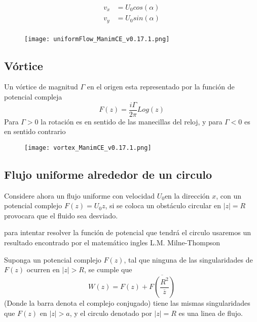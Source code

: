 \documentclass[12pt]{article}
\begin{document}
			\begin{equation}
				\begin{split}
				v_x &= U_0 cos(\alpha)\\
				v_y &= U_0 sin(\alpha)\\
				\end{split}
			\end{equation}
			\begin{figure}[!h]
				\begin{small}
					\begin{center}
						\texttt{[image: uniformFlow\_ManimCE\_v0.17.1.png]}
					\end{center}
					\caption{}
				\end{small}
			\end{figure}
			

		\subsection{Vórtice}
			Un vórtice de magnitud $\Gamma $ en el origen esta representado por la función de potencial compleja
			\begin{equation}
				F(z)= \frac{i\Gamma}{2 \pi} Log(z)
			\end{equation}
			Para $\Gamma>0$ la rotación es en sentido de las manecillas del reloj, y para $\Gamma<0$ es en sentido contrario
			\begin{figure}[!h]
				\begin{small}
					\begin{center}
						\texttt{[image: vortex\_ManimCE\_v0.17.1.png]}
					\end{center}
					\caption{}
				\end{small}
			\end{figure}
			

		\subsection{Flujo uniforme alrededor de un circulo }
		Considere ahora un flujo uniforme con velocidad $U_0$en la dirección $x$, con un potencial complejo $F(z)= U_0 z$, si se coloca un obstáculo circular en $|z| =R$ provocara que el fluido sea desviado.
		
		para intentar resolver la función de potencial que tendrá el circulo usaremos un resultado encontrado por el matemático ingles L.M. Milne-Thompson 
		\begin{theorem}
			Suponga un potencial complejo $F(z)$, tal que ninguna de las singularidades de $F(z)$ ocurren en $|z|>R$, se cumple que
			\begin{equation}
				W(z) = F(z) + \overline{F \left( \frac{R^2}{\overline{z} }\right)} 
				\label{Teorema_del_circulo}
			\end{equation}
			(Donde la barra denota el complejo conjugado) tiene las mismas singularidades que $F(z)$ en $|z|>a $, y el circulo denotado por $|z|= R $ es una linea de flujo.
		\end{theorem}
		
\end{document}
